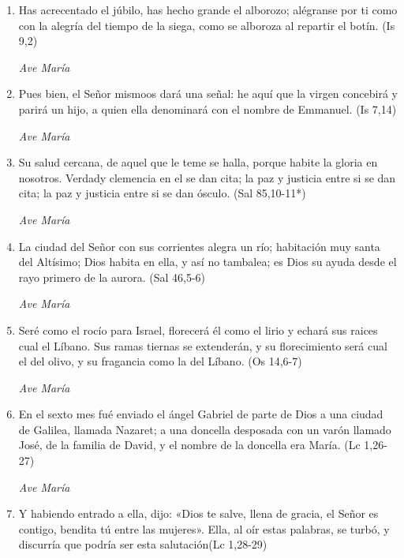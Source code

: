 \documentclass[a4paper,11pt, oneside]{report}
\begin{document}
        \begin{enumerate}
          \item Has acrecentado el júbilo, has hecho grande el alborozo; alégranse por ti como con la alegría del tiempo de la siega, 
          como se alboroza al repartir el botín. (Is 9,2)

          \textit{Ave María}

          \item Pues bien, el Señor mismoos dará una señal: he aquí que la virgen concebirá y parirá un hijo, a quien ella denominará con el nombre de Emmanuel. (Is 7,14)

          \textit{Ave María}

          \item Su salud cercana, de aquel que le teme se halla, porque habite la gloria en nosotros. Verdady clemencia en el se dan cita;
          la paz y justicia entre si se dan cita; la paz y justicia entre si se dan ósculo. (Sal 85,10-11*)

          \textit{Ave María}

          \item La ciudad del Señor con sus corrientes alegra un río; habitación muy santa del Altísimo; Dios habita en ella, y así no tambalea; es Dios
          su ayuda desde el rayo primero de la aurora. (Sal 46,5-6)

          \textit{Ave María}

          \item Seré como el rocío para Israel, florecerá él como el lirio y echará sus raices cual el Líbano. Sus ramas tiernas se extenderán,
          y su florecimiento será cual el del olivo, y su fragancia como la del Líbano. (Os 14,6-7)

          \textit{Ave María}

          \item En el sexto mes fué enviado el ángel Gabriel de parte de Dios a una ciudad de Galilea, llamada Nazaret; a una doncella desposada con un varón
          llamado José, de la familia de David, y el nombre de la doncella era María. (Lc 1,26-27)

          \textit{Ave María}

          \item Y habiendo entrado a ella, dijo: «Dios te salve, llena de gracia, el Señor es contigo, bendita tú entre las mujeres». Ella, al oír estas
          palabras, se turbó, y discurría que podría ser esta salutación(Lc 1,28-29)
          

\end{enumerate}
\end{document}
